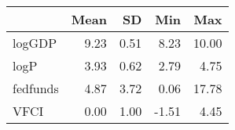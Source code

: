 \begingroup
\fontsize{12.0pt}{14.4pt}\selectfont
\begin{tabular}{lrrrr}
\toprule
  & Mean & SD & Min & Max \\ 
\midrule\addlinespace[2.5pt]
logGDP & 9.23 & 0.51 & 8.23 & 10.00 \\ 
logP & 3.93 & 0.62 & 2.79 & 4.75 \\ 
fedfunds & 4.87 & 3.72 & 0.06 & 17.78 \\ 
VFCI & 0.00 & 1.00 & -1.51 & 4.45 \\ 
\bottomrule
\end{tabular}
\endgroup

